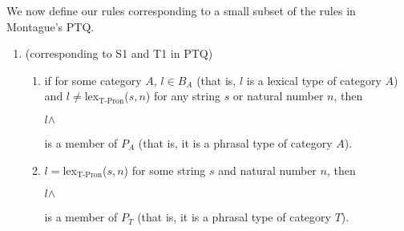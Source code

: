 We now define our rules corresponding to a small subset of the rules in Montague's PTQ.

\begin{enumerate}

\renewcommand{\labelenumi}{R\arabic{enumi}.}
 
\item (corresponding to S1 and T1 in PTQ) \label{rule:lexphrases}

\begin{enumerate} 
 
\item if for some category $A$, $l\in B_A$ (that is, $l$ is a lexical
  type of category $A$) and
  $l\not=$lex$_{\mathrm{T}\textrm{-}\mathrm{Pron}}$($s,n$) for any
  string $s$ or natural number $n$, then 
\begin{display}
$l$\d{$\wedge$}
\end{display}
is a member of $P_A$ (that is, it is a phrasal
  type of category $A$). 
 
\item  $l=$lex$_{\mathrm{T}\textrm{-}\mathrm{Pron}}$($s,n$) for some
  string $s$ and natural number $n$, then 
\begin{display}
$l$\d{$\wedge$}
\end{display}
is a member of $P_T$ (that is, it is a phrasal
  type of category $T$).


\end{enumerate}
\end{enumerate}
